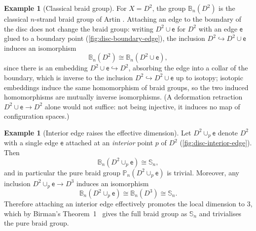 \documentclass[reqno]{amsart}
\theoremstyle{definition}
\newtheorem{example}[theorem]{Example}
\newcommand{\PB}{\mathbb{P}}
\newcommand{\BG}{\mathbb{B}}
\numberwithin{equation}{section}
\begin{document}
\begin{example}[Classical braid group]\label{ex:disc}
For \(X = D^2\), the group \(\BG_n(D^2)\) is the classical \(n\)-strand
braid group of Artin \cite{Artin1947}. Attaching an edge to the
boundary of the disc does not change the braid group: writing
\(D^2\cup \mathsf{e}\) for \(D^2\) with an edge \(\mathsf{e}\) glued
to a boundary point (\cref{fig:disc-boundary-edge}), the inclusion
\(D^2\hookrightarrow D^2\cup \mathsf{e}\) induces an isomorphism
\[
\BG_n(D^2) \cong \BG_n(D^2\cup \mathsf{e}),
\]
since there is an embedding
\(D^2\cup\mathsf{e}\hookrightarrow D^2\), absorbing the edge
into a collar of the boundary, which is inverse to the
inclusion \(D^2\hookrightarrow D^2\cup\mathsf{e}\) up to
isotopy; isotopic embeddings induce the same homomorphism of
braid groups, so the two induced homomorphisms are mutually
inverse isomorphisms. (A deformation retraction
\(D^2\cup\mathsf{e}\to D^2\) alone would not suffice: not
being injective, it induces no map of configuration spaces.)
\end{example}

\begin{example}[Interior edge raises the effective
dimension]\label{ex:disc-interior}
Let \(D^2\cup_p \mathsf{e}\) denote \(D^2\) with a single edge
\(\mathsf{e}\) attached at an \emph{interior} point \(p\) of \(D^2\)
(\cref{fig:disc-interior-edge}). Then
\[
\BG_n(D^2\cup_p \mathsf{e}) \cong \mathbb{S}_n,
\]
and in particular the pure braid group
\(\PB_n(D^2\cup_p \mathsf{e})\) is trivial. Moreover, any inclusion \(D^2\cup_p \mathsf{e}\to D^3\) induces an isomorphism
\[
\BG_n(D^2\cup_p \mathsf{e}) \cong \BG_n(D^3)
\cong \mathbb{S}_n.
\]
Therefore attaching an interior edge effectively promotes the local
dimension to \(3\), which by Birman's Theorem~1~\cite[Thm.~1]{Birman1969}
gives the full braid group as \(\mathbb{S}_n\) and
trivialises the pure braid group.
\end{example}
\end{document}
